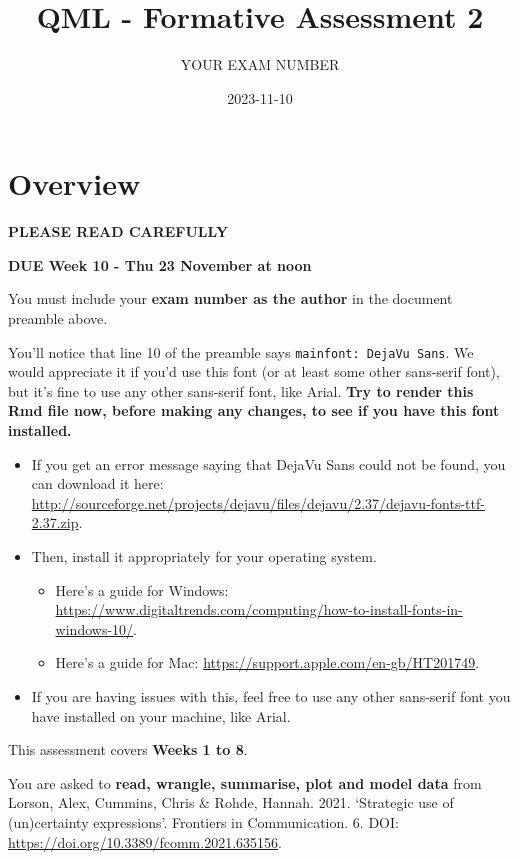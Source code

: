 \documentclass[
]{article}
\title{QML - Formative Assessment 2}
\author{YOUR EXAM NUMBER}
\date{2023-11-10}
\providecommand{\tightlist}{%
  \setlength{\itemsep}{0pt}\setlength{\parskip}{0pt}}
\begin{document}
\maketitle

\section{Overview}\label{overview}

\textbf{PLEASE READ CAREFULLY}

\textbf{DUE Week 10 - Thu 23 November at noon}

You must include your \textbf{exam number as the author} in the document
preamble above.

You'll notice that line 10 of the preamble says
\texttt{mainfont:\ DejaVu\ Sans}. We would appreciate it if you'd use
this font (or at least some other sans-serif font), but it's fine to use
any other sans-serif font, like Arial. \textbf{Try to render this Rmd
file now, before making any changes, to see if you have this font
installed.}

\begin{itemize}
\tightlist
\item
  If you get an error message saying that DejaVu Sans could not be
  found, you can download it here:
  \url{http://sourceforge.net/projects/dejavu/files/dejavu/2.37/dejavu-fonts-ttf-2.37.zip}.
\item
  Then, install it appropriately for your operating system.

  \begin{itemize}
  \tightlist
  \item
    Here's a guide for Windows:
    \url{https://www.digitaltrends.com/computing/how-to-install-fonts-in-windows-10/}.
  \item
    Here's a guide for Mac:
    \url{https://support.apple.com/en-gb/HT201749}.
  \end{itemize}
\item
  If you are having issues with this, feel free to use any other
  sans-serif font you have installed on your machine, like Arial.
\end{itemize}

This assessment covers \textbf{Weeks 1 to 8}.

You are asked to \textbf{read, wrangle, summarise, plot and model data}
from Lorson, Alex, Cummins, Chris \& Rohde, Hannah. 2021. `Strategic use
of (un)certainty expressions'. Frontiers in Communication. 6. DOI:
\url{https://doi.org/10.3389/fcomm.2021.635156}.
\end{document}
